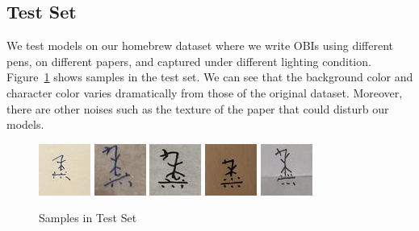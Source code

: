 \documentclass[journal]{IEEEtran}
\begin{document}
\subsection{Test Set}
We test models on our homebrew dataset where we write OBIs using different pens, on different papers, and captured under different lighting condition.
Figure~\ref{fig:testset} shows samples in the test set.
We can see that the background color and character color varies dramatically from those of the original dataset.
Moreover, there are other noises such as the texture of the paper that could disturb our models.
\begin{figure}[h]
	\centering
	\includegraphics[width=0.19\linewidth]{fig/testset/test_bxy_2_30.jpg}
	\includegraphics[width=0.19\linewidth]{fig/testset/test_lcx_1_40.jpg}
	\includegraphics[width=0.19\linewidth]{fig/testset/test_ljy_2_28.jpg}
	\includegraphics[width=0.19\linewidth]{fig/testset/test_wzy_1_30.jpg}
	\includegraphics[width=0.19\linewidth]{fig/testset/test_xsn_2_28.jpg}
	\caption{Samples in Test Set}
	\label{fig:testset}
\end{figure}
\end{document}
